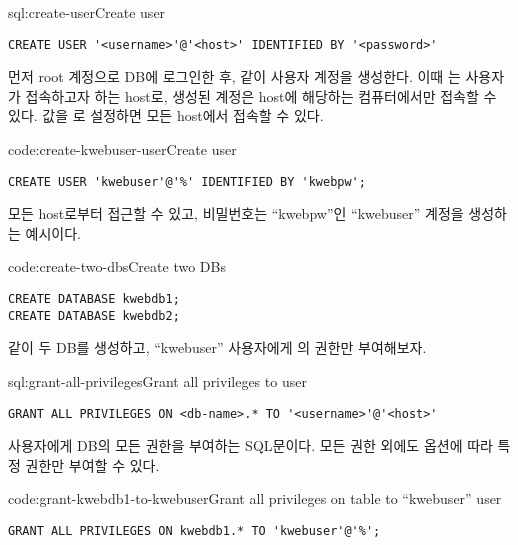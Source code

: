 \begin{sql}{sql:create-user}{Create user}
\begin{verbatim}
CREATE USER '<username>'@'<host>' IDENTIFIED BY '<password>'
\end{verbatim}
\end{sql}

먼저 root 계정으로 DB에 로그인한 후, \과 같이 사용자 계정을 생성한다. 이때 는 사용자가 접속하고자 하는 host로, 생성된 계정은 host에 해당하는 컴퓨터에서만 접속할 수 있다.  값을 \cd{\%}로 설정하면 모든 host에서 접속할 수 있다.

\begin{code}{code:create-kwebuser-user}{Create  user}
\begin{verbatim}
CREATE USER 'kwebuser'@'%' IDENTIFIED BY 'kwebpw';
\end{verbatim}
\end{code}

\는 모든 host로부터 접근할 수 있고, 비밀번호는 ``kwebpw''인 ``kwebuser'' 계정을 생성하는 예시이다.

\begin{code}{code:create-two-dbs}{Create two DBs}
\begin{verbatim}
CREATE DATABASE kwebdb1;
CREATE DATABASE kwebdb2;
\end{verbatim}
\end{code}

\와 같이 두 DB를 생성하고, ``kwebuser'' 사용자에게 의 권한만 부여해보자.

\begin{sql}{sql:grant-all-privileges}{Grant all privileges to user}
\begin{verbatim}
GRANT ALL PRIVILEGES ON <db-name>.* TO '<username>'@'<host>'
\end{verbatim}
\end{sql}

\는 사용자에게  DB의 모든 권한을 부여하는 SQL문이다. 모든 권한 외에도 옵션에 따라 특정 권한만 부여할 수 있다.

\begin{code}{code:grant-kwebdb1-to-kwebuser}{Grant all privileges on  table to ``kwebuser'' user}
\begin{verbatim}
GRANT ALL PRIVILEGES ON kwebdb1.* TO 'kwebuser'@'%';
\end{verbatim}
\end{code}


